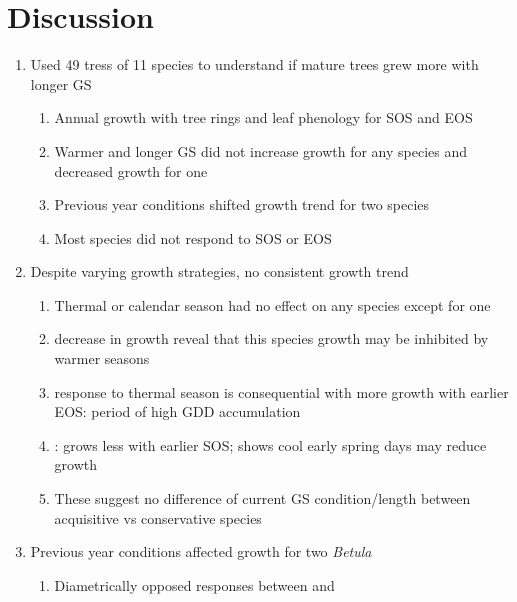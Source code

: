 \documentclass{article}\usepackage[]{graphicx}\usepackage[]{xcolor}
\begin{document}
\section*{Discussion}
\begin{enumerate}
\item Used 49 tress of 11 species to understand if mature trees grew more with longer GS
  \begin{enumerate}
  \item Annual growth with tree rings and leaf phenology for SOS and EOS
  
  \item Warmer and longer GS did not increase growth for any species and decreased growth for one
  
  \item Previous year conditions shifted growth trend for two species
  
  \item Most species did not respond to SOS or EOS
  
  \end{enumerate}

\item Despite varying growth strategies, no consistent growth trend
  \begin{enumerate}
  \item Thermal or calendar season had no effect on any species except for one
  
  \item {\Ball} decrease in growth reveal that this species growth may be inhibited by warmer seasons
  
  \item {\Ball} response to thermal season is consequential with more growth with earlier EOS: period of high GDD accumulation
  
  \item {\Tame}: grows less with earlier SOS; shows cool early spring days may reduce growth
  
  \item These suggest no difference of current GS condition/length between acquisitive vs conservative species 
  
  \end{enumerate}

\item Previous year conditions affected growth for two \textit{Betula}
  \begin{enumerate}
  \item Diametrically opposed responses between {\Ball} and {\Bnig}
  

\end{enumerate}
\end{enumerate}
\end{document}
